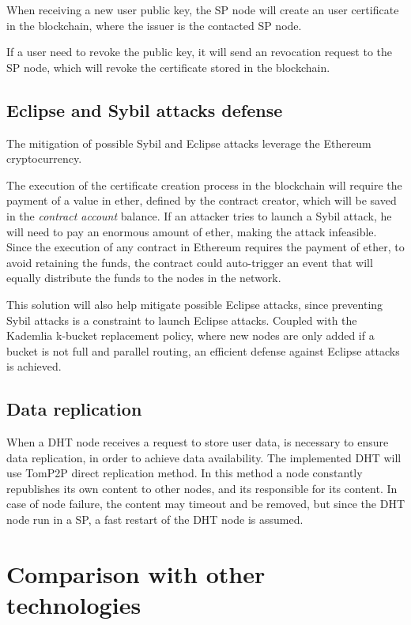 When receiving a new user public key, the SP node will create an user certificate in the blockchain, where the issuer is the contacted SP node.

If a user need to revoke the public key, it will send an revocation request to the SP node, which will revoke the certificate stored in the blockchain.

\subsection{Eclipse and Sybil attacks defense}
The mitigation of possible Sybil and Eclipse attacks leverage the Ethereum cryptocurrency.

The execution of the certificate creation process in the blockchain will require the payment of a value in ether, defined by the contract creator, which will be saved in the \textit{contract account} balance.
If an attacker tries to launch a Sybil attack, he will need to pay an enormous amount of ether, making the attack infeasible.
Since the execution of any contract in Ethereum requires the payment of ether, to avoid retaining the funds, the contract could auto-trigger an event that will equally distribute the funds to the nodes in the network.

This solution will also help mitigate possible Eclipse attacks, since preventing Sybil attacks is a constraint to launch Eclipse attacks.
Coupled with the Kademlia k-bucket replacement policy, where new nodes are only added if a bucket is not full and parallel routing, an efficient defense against Eclipse attacks is achieved.

\subsection{Data replication}
When a DHT node receives a request to store user data, is necessary to ensure data replication, in order to achieve data availability.
The implemented DHT will use TomP2P direct replication method. In this method a node constantly republishes its own content to other nodes, and its responsible for its content.
In case of node failure, the content may timeout and be removed, but since the DHT node run in a SP, a fast restart of the DHT node is assumed.

\section{Comparison with other technologies}
